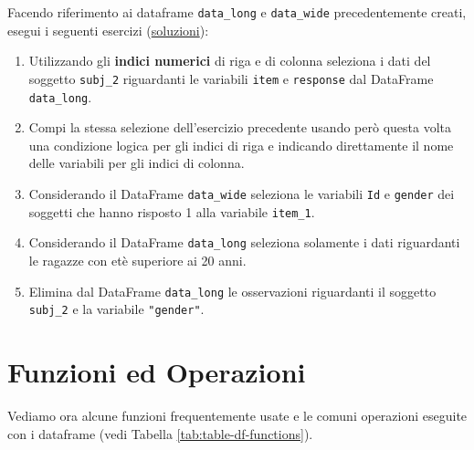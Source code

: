 \documentclass[
]{book}
\providecommand{\tightlist}{%
  \setlength{\itemsep}{0pt}\setlength{\parskip}{0pt}}
\begin{document}
Facendo riferimento ai dataframe \texttt{data\_long} e \texttt{data\_wide} precedentemente creati, esegui i seguenti esercizi (\href{https://github.com/psicostat/Introduction2R/blob/master/exercises/chapter-10-dataframe.R}{soluzioni}):

\begin{enumerate}
\def\labelenumi{\arabic{enumi}.}
\tightlist
\item
  Utilizzando gli \textbf{indici numerici} di riga e di colonna seleziona i dati del soggetto \texttt{subj\_2} riguardanti le variabili \texttt{item} e \texttt{response} dal DataFrame \texttt{data\_long}.
\item
  Compi la stessa selezione dell'esercizio precedente usando però questa volta una condizione logica per gli indici di riga e indicando direttamente il nome delle variabili per gli indici di colonna.
\item
  Considerando il DataFrame \texttt{data\_wide} seleziona le variabili \texttt{Id} e \texttt{gender} dei soggetti che hanno risposto 1 alla variabile \texttt{item\_1}.
\item
  Considerando il DataFrame \texttt{data\_long} seleziona solamente i dati riguardanti le ragazze con etè superiore ai 20 anni.
\item
  Elimina dal DataFrame \texttt{data\_long} le osservazioni riguardanti il soggetto \texttt{subj\_2} e la variabile \texttt{"gender"}.
\end{enumerate}

\hypertarget{funzioni-ed-operazioni-1}{%
\section{Funzioni ed Operazioni}\label{funzioni-ed-operazioni-1}}

Vediamo ora alcune funzioni frequentemente usate e le comuni operazioni eseguite con i dataframe (vedi Tabella \ref{tab:table-df-functions}).
\end{document}
